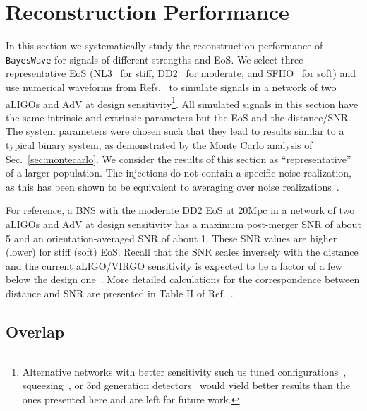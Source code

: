 \documentclass[aps,prd,amsmath,floats,floatfix, twocolumn,
superscriptaddress,nofootinbib,showpacs]{revtex4-1}
\begin{document}
\section{Reconstruction Performance}
\label{sec:reconstruction}

In this section we systematically study the reconstruction performance of {\tt BayesWave} for signals of different strengths and EoS. We select three representative EoS (NL3~\cite{1997PhRvC..55..540L,2010NuPhA.837..210H} for stiff, DD2~\cite{2010NuPhA.837..210H,2010PhRvC..81a5803T} for moderate, and SFHO~\cite{2013ApJ...774...17S} for soft) and use numerical waveforms from Refs.~\cite{bauswein:14,bauswein:july15} to simulate signals in a network of two aLIGOs and AdV at design sensitivity\footnote{Alternative networks with better sensitivity such us tuned configurations~\cite{AdvLIGO-noise}, squeezing~\cite{PhysRevD.91.044032}, or 3rd generation detectors~\cite{Hild:2010id,0264-9381-34-4-044001} would yield better results than the ones presented here and are left for future work.}. All simulated signals in this section have the same intrinsic and extrinsic parameters but the EoS and the distance/SNR. The system parameters were chosen such that they lead to results similar to a typical binary system, as demonstrated by the Monte Carlo analysis of Sec.~\ref{sec:montecarlo}. We consider the results of this section as ``representative'' of a larger population. The injections do not contain a specific noise realization, as this has been shown to be equivalent to averaging over noise realizations~\cite{Nissanke:2009kt}.

For reference, a BNS with the moderate DD2 EoS at 20Mpc in a network of two aLIGOs and AdV at design sensitivity has a maximum post-merger SNR of about 5 and an orientation-averaged SNR of about 1. These SNR values are higher (lower) for stiff (soft) EoS. Recall that the SNR scales inversely with the distance and the current aLIGO/VIRGO sensitivity is expected to be a factor of a few below the design one~\cite{Aasi:2013wya}. More detailed calculations for the correspondence between distance and SNR are presented in Table II of Ref.~\cite{Clark:2015zxa}.






\subsection{Overlap}
\label{sec:overlap}
\end{document}
